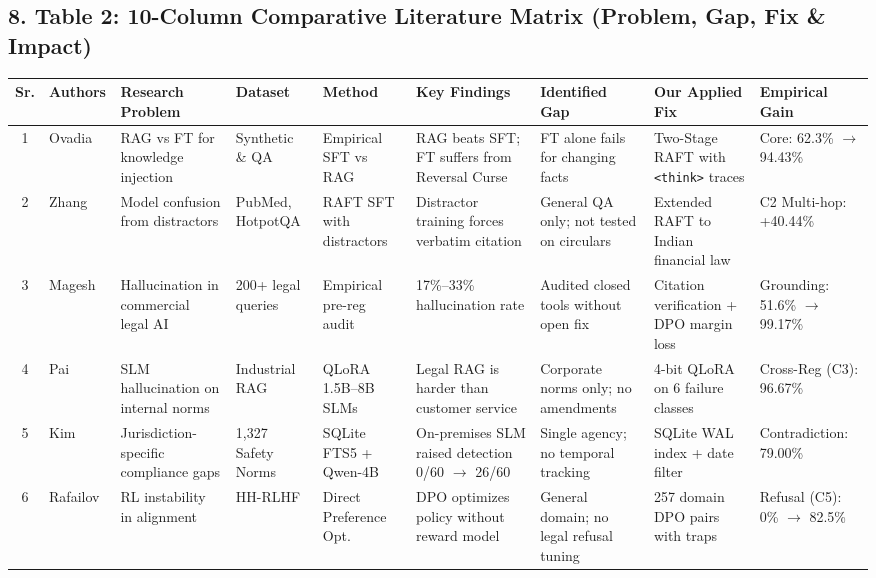 \documentclass[11pt,a4paper]{article}
\begin{document}
\subsection*{8. Table 2: 10-Column Comparative Literature Matrix (Problem, Gap, Fix \& Impact)}

\begin{table}[h!]
\centering
\tiny
\begin{tabularx}{\textwidth}{|c|l|X|l|l|X|X|X|l|}
\hline
\rowcolor{tablehead} \textbf{Sr.} & \textbf{Authors} & \textbf{Research Problem} & \textbf{Dataset} & \textbf{Method} & \textbf{Key Findings} & \textbf{Identified Gap} & \textbf{Our Applied Fix} & \textbf{Empirical Gain} \\ \hline
1 & Ovadia~\cite{ovadia2024knowledge} & RAG vs FT for knowledge injection & Synthetic \& QA & Empirical SFT vs RAG & RAG beats SFT; FT suffers from Reversal Curse & FT alone fails for changing facts & Two-Stage RAFT with \texttt{<think>} traces & Core: 62.3\% $\rightarrow$ 94.43\% \\ \hline
2 & Zhang~\cite{zhang2024raft} & Model confusion from distractors & PubMed, HotpotQA & RAFT SFT with distractors & Distractor training forces verbatim citation & General QA only; not tested on circulars & Extended RAFT to Indian financial law & C2 Multi-hop: +40.44\% \\ \hline
3 & Magesh~\cite{magesh2025hallucination} & Hallucination in commercial legal AI & 200+ legal queries & Empirical pre-reg audit & 17\%--33\% hallucination rate & Audited closed tools without open fix & Citation verification + DPO margin loss & Grounding: 51.6\% $\rightarrow$ 99.17\% \\ \hline
4 & Pai~\cite{pai2026finetuning} & SLM hallucination on internal norms & Industrial RAG & QLoRA 1.5B--8B SLMs & Legal RAG is harder than customer service & Corporate norms only; no amendments & 4-bit QLoRA on 6 failure classes & Cross-Reg (C3): 96.67\% \\ \hline
5 & Kim~\cite{kim2026jurisdiction} & Jurisdiction-specific compliance gaps & 1,327 Safety Norms & SQLite FTS5 + Qwen-4B & On-premises SLM raised detection 0/60 $\rightarrow$ 26/60 & Single agency; no temporal tracking & SQLite WAL index + date filter & Contradiction: 79.00\% \\ \hline
6 & Rafailov~\cite{rafailov2023dpo} & RL instability in alignment & HH-RLHF & Direct Preference Opt. & DPO optimizes policy without reward model & General domain; no legal refusal tuning & 257 domain DPO pairs with traps & Refusal (C5): 0\% $\rightarrow$ 82.5\% \\ \hline

\end{tabularx}
\end{table}
\end{document}
